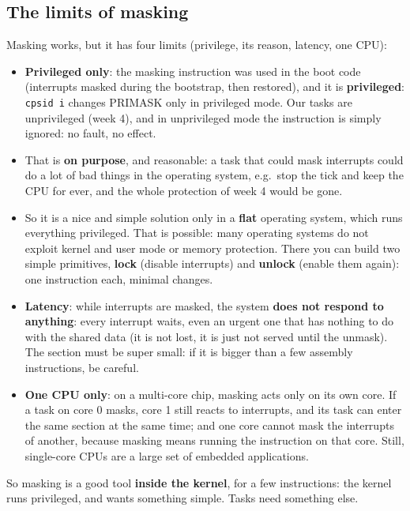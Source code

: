 \subsection{The limits of masking}
Masking works, but it has four limits (privilege, its reason, latency, one CPU):
\begin{itemize}
    \item \textbf{Privileged only}: the masking instruction was used in the boot code (interrupts masked during the bootstrap, then restored), and it is \textbf{privileged}: \texttt{cpsid i} changes PRIMASK only in privileged mode. Our tasks are unprivileged (week 4), and in unprivileged mode the instruction is simply ignored: no fault, no effect.
    \item That is \textbf{on purpose}, and reasonable: a task that could mask interrupts could do a lot of bad things in the operating system, e.g.\ stop the tick and keep the CPU for ever, and the whole protection of week 4 would be gone.
    \item So it is a nice and simple solution only in a \textbf{flat} operating system, which runs everything privileged. That is possible: many operating systems do not exploit kernel and user mode or memory protection. There you can build two simple primitives, \textbf{lock} (disable interrupts) and \textbf{unlock} (enable them again): one instruction each, minimal changes.
    \item \textbf{Latency}: while interrupts are masked, the system \textbf{does not respond to anything}: every interrupt waits, even an urgent one that has nothing to do with the shared data (it is not lost, it is just not served until the unmask). The section must be super small: if it is bigger than a few assembly instructions, be careful.
    \item \textbf{One CPU only}: on a multi-core chip, masking acts only on its own core. If a task on core 0 masks, core 1 still reacts to interrupts, and its task can enter the same section at the same time; and one core cannot mask the interrupts of another, because masking means running the instruction on that core. Still, single-core CPUs are a large set of embedded applications.
\end{itemize}
So masking is a good tool \textbf{inside the kernel}, for a few instructions: the kernel runs privileged, and wants something simple. Tasks need something else.

